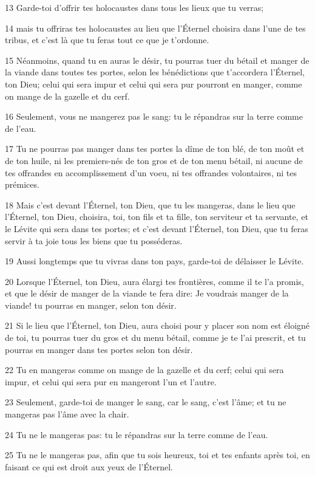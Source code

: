 \par 13 Garde-toi d'offrir tes holocaustes dans tous les lieux que tu verras;
\par 14 mais tu offriras tes holocaustes au lieu que l'Éternel choisira dans l'une de tes tribus, et c'est là que tu feras tout ce que je t'ordonne.
\par 15 Néanmoins, quand tu en auras le désir, tu pourras tuer du bétail et manger de la viande dans toutes tes portes, selon les bénédictions que t'accordera l'Éternel, ton Dieu; celui qui sera impur et celui qui sera pur pourront en manger, comme on mange de la gazelle et du cerf.
\par 16 Seulement, vous ne mangerez pas le sang: tu le répandras sur la terre comme de l'eau.
\par 17 Tu ne pourras pas manger dans tes portes la dîme de ton blé, de ton moût et de ton huile, ni les premiers-nés de ton gros et de ton menu bétail, ni aucune de tes offrandes en accomplissement d'un voeu, ni tes offrandes volontaires, ni tes prémices.
\par 18 Mais c'est devant l'Éternel, ton Dieu, que tu les mangeras, dans le lieu que l'Éternel, ton Dieu, choisira, toi, ton fils et ta fille, ton serviteur et ta servante, et le Lévite qui sera dans tes portes; et c'est devant l'Éternel, ton Dieu, que tu feras servir à ta joie tous les biens que tu posséderas.
\par 19 Aussi longtemps que tu vivras dans ton pays, garde-toi de délaisser le Lévite.
\par 20 Lorsque l'Éternel, ton Dieu, aura élargi tes frontières, comme il te l'a promis, et que le désir de manger de la viande te fera dire: Je voudrais manger de la viande! tu pourras en manger, selon ton désir.
\par 21 Si le lieu que l'Éternel, ton Dieu, aura choisi pour y placer son nom est éloigné de toi, tu pourras tuer du gros et du menu bétail, comme je te l'ai prescrit, et tu pourras en manger dans tes portes selon ton désir.
\par 22 Tu en mangeras comme on mange de la gazelle et du cerf; celui qui sera impur, et celui qui sera pur en mangeront l'un et l'autre.
\par 23 Seulement, garde-toi de manger le sang, car le sang, c'est l'âme; et tu ne mangeras pas l'âme avec la chair.
\par 24 Tu ne le mangeras pas: tu le répandras sur la terre comme de l'eau.
\par 25 Tu ne le mangeras pas, afin que tu sois heureux, toi et tes enfants après toi, en faisant ce qui est droit aux yeux de l'Éternel.
